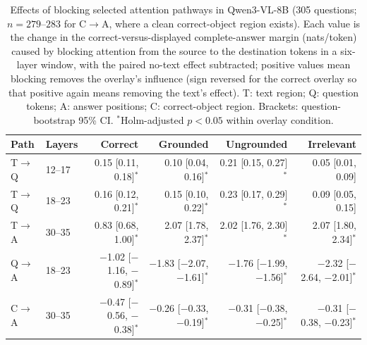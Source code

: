 \begin{table}[t]
\centering
\small
\setlength{\tabcolsep}{4pt}
\begin{tabular}{llrrrr}
\toprule
Path & Layers & Correct & Grounded & Ungrounded & Irrelevant \\
\midrule
T$\rightarrow$Q & 12--17 & 0.15 [0.11, 0.18]$^{*}$ & 0.10 [0.04, 0.16]$^{*}$ & 0.21 [0.15, 0.27]$^{*}$ & 0.05 [0.01, 0.09]\phantom{$^{*}$} \\
T$\rightarrow$Q & 18--23 & 0.16 [0.12, 0.21]$^{*}$ & 0.15 [0.10, 0.22]$^{*}$ & 0.23 [0.17, 0.29]$^{*}$ & 0.09 [0.05, 0.15]\phantom{$^{*}$} \\
T$\rightarrow$A & 30--35 & 0.83 [0.68, 1.00]$^{*}$ & 2.07 [1.78, 2.37]$^{*}$ & 2.02 [1.76, 2.30]$^{*}$ & 2.07 [1.80, 2.34]$^{*}$ \\
Q$\rightarrow$A & 18--23 & $-$1.02 [$-$1.16, $-$0.89]$^{*}$ & $-$1.83 [$-$2.07, $-$1.61]$^{*}$ & $-$1.76 [$-$1.99, $-$1.56]$^{*}$ & $-$2.32 [$-$2.64, $-$2.01]$^{*}$ \\
C$\rightarrow$A & 30--35 & $-$0.47 [$-$0.56, $-$0.38]$^{*}$ & $-$0.26 [$-$0.33, $-$0.19]$^{*}$ & $-$0.31 [$-$0.38, $-$0.25]$^{*}$ & $-$0.31 [$-$0.38, $-$0.23]$^{*}$ \\
\bottomrule
\end{tabular}
\caption{Effects of blocking selected attention pathways in Qwen3-VL-8B (305 questions; $n{=}279$--$283$ for C$\rightarrow$A, where a clean correct-object region exists). Each value is the change in the correct-versus-displayed complete-answer margin (nats/token) caused by blocking attention from the source to the destination tokens in a six-layer window, with the paired no-text effect subtracted; positive values mean blocking removes the overlay's influence (sign reversed for the correct overlay so that positive again means removing the text's effect). T: text region; Q: question tokens; A: answer positions; C: correct-object region. Brackets: question-bootstrap 95\% CI. $^{*}$Holm-adjusted $p<0.05$ within overlay condition.}
\label{tab:attention-effects}
\end{table}
